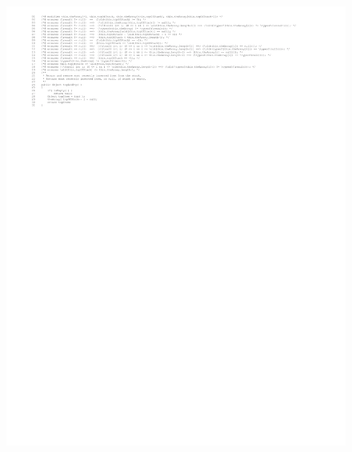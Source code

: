 \documentclass [11pt, a4wide, twoside]{article}
\begin{document}
\begin{figure}[h]
\centering
\includegraphics[scale=1.0,trim=1.9cm 22cm 2cm 1cm]{figures/Daikon.pdf}
\end{figure}
\end{document}
